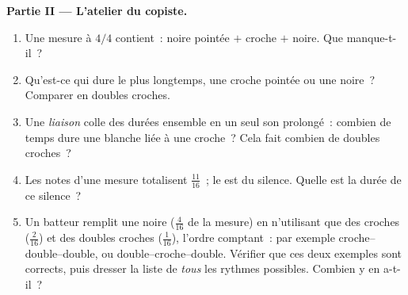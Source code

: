 \begin{problem}
\medskip
\noindent\textbf{Partie II --- L'atelier du copiste.}
\begin{enumerate}[resume]
  \item Une mesure à $4/4$ contient~: noire pointée $+$ croche $+$
        noire. Que manque-t-il~?
  \item Qu'est-ce qui dure le plus longtemps, une croche pointée ou
        une noire~? Comparer en doubles croches.
  \item Une \emph{liaison} colle des durées ensemble en un seul son
        prolongé~: combien de temps dure une blanche liée à une
        croche~? Cela fait combien de doubles croches~?
  \item Les notes d'une mesure totalisent $\frac{11}{16}$~; le
         est du silence. Quelle est la durée de ce silence~?
  \item Un batteur remplit une noire ($\frac{4}{16}$ de la mesure)
        en n'utilisant que des croches ($\frac{2}{16}$) et des
        doubles croches ($\frac{1}{16}$), l'ordre comptant~: par
        exemple croche--double--double, ou double--croche--double.
        Vérifier que ces deux exemples sont corrects, puis dresser
        la liste de \emph{tous} les rythmes possibles. Combien y
        en a-t-il~?
\end{enumerate}


\end{problem}

